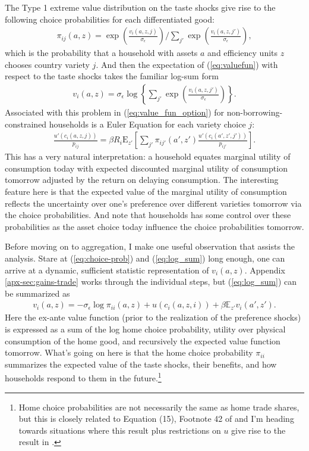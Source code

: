 \documentclass[12pt,pdftex]{article}
\begin{document}
\begin{onehalfspacing}
The Type 1 extreme value distribution on the taste shocks give rise to the following choice probabilities for each differentiated good:
\begin{align}
\pi_{ij}(a, z) = \exp \left( \frac{ v_{i}(a, z, j) }{\sigma_{\epsilon}} \right) \Bigg / \sum_{j'} \exp \left( \frac{ v_{i}(a, z, j') }{\sigma_{\epsilon}} \right), \label{eq:choice-prob}
\end{align}
which is the probability that a household with assets $a$ and efficiency units $z$ chooses country variety $j$. And then the expectation of (\ref{eq:valuefun}) with respect to the taste shocks takes the familiar log-sum form
\begin{align}
v_i(a, z) = \sigma_{\epsilon} \log \left\{ \sum_{j'} \exp \left( \frac{  v_{i}(a, z, j')}{\sigma_{\epsilon}} \right) \right\}. \label{eq:log_sum}
\end{align}
Associated with this problem in (\ref{eq:value_fun_option}) for non-borrowing-constrained households is a Euler Equation for each variety choice $j$:
\begin{align}
\frac{u'(c_{i}(a, z, j))}{p_{ij}} = \beta R_{i} \mathrm{E}_{z'} \left[ \sum_{j'} \pi_{ij'}(a', z') \frac{u'(c_{i}(a', z', j'))}{p_{ij'}} \right].
\label{eq:euler_equation}
\end{align}
This has a very natural interpretation: a household equates marginal utility of consumption today with expected discounted marginal utility of consumption tomorrow adjusted by the return on delaying consumption. The interesting feature here is that the expected value of the marginal utility of consumption reflects the uncertainty over one's preference over different varieties tomorrow via the choice probabilities. And note that households has some control over these probabilities as the asset choice today influence the choice probabilities tomorrow.

Before moving on to aggregation, I make one useful observation that assists the analysis. Stare at (\ref{eq:choice-prob}) and (\ref{eq:log_sum}) long enough, one can arrive at a dynamic, sufficient statistic representation of $v_i(a, z)$. Appendix \ref{apx-sec:gains-trade} works through the individual steps, but (\ref{eq:log_sum}) can be summarized as
\begin{align}
v_i(a, z) = -\sigma_{\epsilon} \log \pi_{ii}(a,z) + u(c_{i}(a,z,i)) + \beta \mathbb{E}_{z'} v_{i}(a',z').
\label{eq:log_sum-home}
\end{align}
Here the ex-ante value function (prior to the realization of the preference shocks) is expressed as a sum of the log home choice probability, utility over physical consumption of the home good, and recursively the expected value function tomorrow. What's going on here is that the home choice probability $\pi_{ii}$ summarizes the expected value of the taste shocks, their benefits, and how households respond to them in the future.\footnote{Home choice probabilities are not necessarily the same as home trade shares, but this is closely related to Equation (15), Footnote 42 of \citet{eaton2002technology} and I'm heading towards situations where this result plus restrictions on $u$ give rise to the result in \citet{arkolakis2012new}.}


\end{onehalfspacing}
\end{document}
